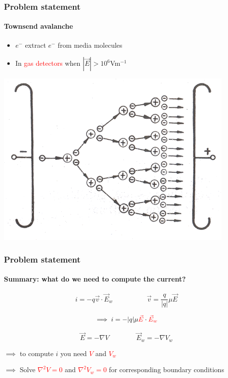 \documentclass[14pt]{beamer}
\begin{document}
\begin{frame}
  \frametitle{Problem statement}
  \framesubtitle{Townsend avalanche}

\begin{itemize}
 \item $e^{-}$ extract $e^{-}$ from media molecules
 \item In \textcolor{red}{gas detectors} when $|\vec{E}| > 10^6$Vm$^{-1}$
\end{itemize}

\begin{center}
\includegraphics[scale=0.35,angle=90]{images/townsend_avalanche.png}
\end{center}

\end{frame}

\begin{frame}
  \frametitle{Problem statement}
  \framesubtitle{Summary: what do we need to compute the current?}

  \vspace{-2em}


\[i = -q \vec{v} \cdot \vec{E}_w \qquad \qquad \quad \vec{v} = \frac{q}{|q|} \mu \vec{E}\]

\[\implies i = - |q| \mu \textcolor{red}{\vec{E}} \cdot \textcolor{red}{\vec{E}_w}\]

\[\vec{E} = -\nabla V \qquad \qquad \vec{E}_w = -\nabla V_w\]

\vspace{1em}

$\implies$ to compute $i$ you need \textcolor{red}{$V$} and \textcolor{red}{$V_w$}

$\implies$ Solve \textcolor{red}{$\nabla^2 V = 0$} and
\textcolor{red}{$\nabla^2 V_w = 0$} for corresponding boundary conditions

\end{frame}
\end{document}
